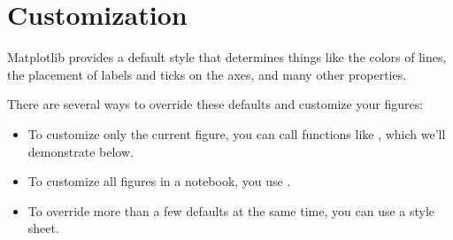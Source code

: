 \documentclass[letterpaper,10pt,english]{sphinxmanual}
\begin{document}
\begin{sphinxVerbatim}[commandchars=\\\{\}]




\end{sphinxVerbatim}


\section{Customization}
\label{\detokenize{07_plot:customization}}
Matplotlib provides a default style that determines things like the colors of lines, the placement of labels and ticks on the axes, and many other properties.

There are several ways to override these defaults and customize your figures:
\begin{itemize}
\item {} 
To customize only the current figure, you can call functions like , which we’ll demonstrate below.

\item {} 
To customize all figures in a notebook, you use .

\item {} 
To override more than a few defaults at the same time, you can use a style sheet.

\end{itemize}
\end{document}

